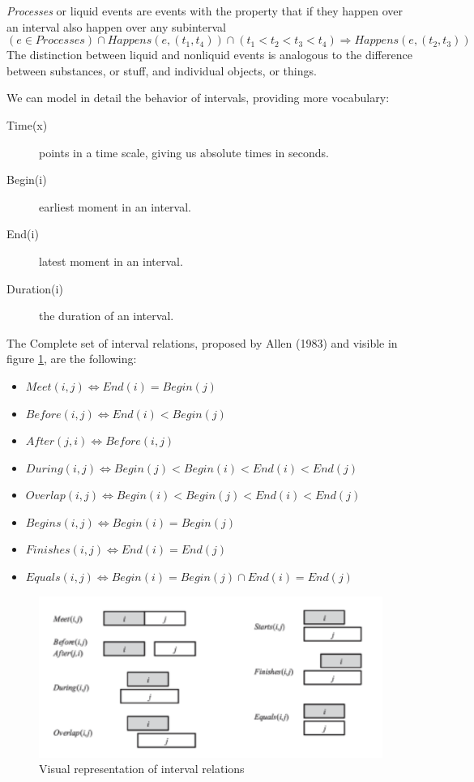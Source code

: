 \emph{Processes} or liquid events are events with the property that if they happen
over an interval also happen over any subinterval
\[ (e \in Processes) \cap Happens(e, (t_1, t_4)) \cap (t_1 < t_2 < t_3 < t_4)
   \Rightarrow Happens(e, (t_2, t_3)) \]
The distinction between liquid and nonliquid events is analogous to the
difference between substances, or stuff, and individual objects, or things.

We can model in detail the behavior of intervals, providing more vocabulary:
\begin{description}
   \item [Time(x)] points in a time scale, giving us absolute times in seconds.
   \item [Begin(i)] earliest moment in an interval.
   \item [End(i)] latest moment in an interval.
   \item [Duration(i)] the duration of an interval.
\end{description}
The Complete set of interval relations, proposed by Allen (1983) and visible in figure
\ref{img:timeInterval}, are the following:
\begin{itemize}
   \item $Meet(i, j) \iff End(i) = Begin(j)$
   \item $Before(i, j) \iff End(i) < Begin(j)$
   \item $After(j, i) \iff Before(i, j)$
   \item $During(i, j) \iff Begin(j) < Begin(i) < End(i) < End(j)$
   \item $Overlap(i, j) \iff Begin(i) < Begin(j) < End(i) < End(j)$
   \item $Begins(i, j) \iff Begin(i) = Begin(j)$
   \item $Finishes(i, j) \iff End(i) = End(j)$
   \item $Equals(i, j) \iff Begin(i) = Begin(j) \cap End(i) = End(j)$
\end{itemize}

\begin{figure}
	\includegraphics[width=\textwidth]{Images/intervalRelations}
	\caption{Visual representation of interval relations}
	\label{img:timeInterval}
\end{figure}

